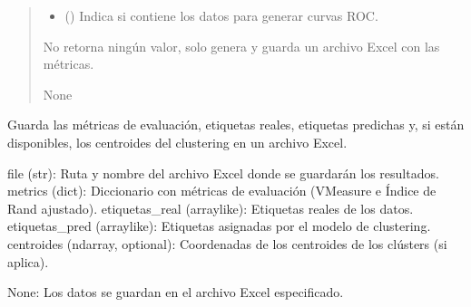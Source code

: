 \documentclass[letterpaper,10pt,spanish]{sphinxmanual}
\begin{document}
\begin{fulllineitems}
\begin{quote}
\begin{description}
\begin{itemize}
\item {} 
\sphinxAtStartPar
{} () \textendash{} Indica si  contiene los datos para generar curvas ROC.

\end{itemize}

\sphinxAtStartPar
No retorna ningún valor, solo genera y guarda un archivo Excel con las métricas.

\sphinxAtStartPar
None

\end{description}\end{quote}

\end{fulllineitems}

\label{\detokenize{Funciones_Generales:module-metricas_clustering}}

\begin{fulllineitems}
\label{\detokenize{Funciones_Generales:metricas_clustering.guardar_metricas_clustering}}
\pysigstartsignatures
\pysiglinewithargsret
{}
{\sphinxparamcomma {}\sphinxparamcomma {}\sphinxparamcomma {}\sphinxparamcomma {}}
{}
\pysigstopsignatures
\sphinxAtStartPar
Guarda las métricas de evaluación, etiquetas reales, etiquetas predichas y, si están disponibles, 
los centroides del clustering en un archivo Excel.
\begin{description}
\sphinxAtStartPar
file (str): Ruta y nombre del archivo Excel donde se guardarán los resultados.
metrics (dict): Diccionario con métricas de evaluación (V\sphinxhyphen{}Measure e Índice de Rand ajustado).
etiquetas\_real (array\sphinxhyphen{}like): Etiquetas reales de los datos.
etiquetas\_pred (array\sphinxhyphen{}like): Etiquetas asignadas por el modelo de clustering.
centroides (ndarray, optional): Coordenadas de los centroides de los clústers (si aplica).

\sphinxAtStartPar
None: Los datos se guardan en el archivo Excel especificado.

\end{description}

\end{fulllineitems}
\end{document}
